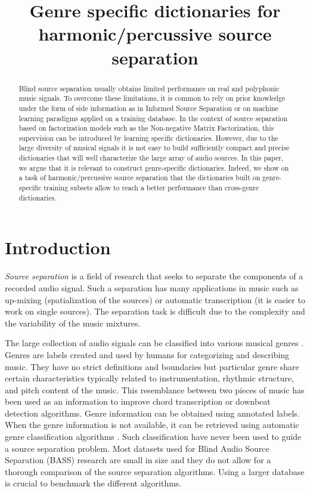 \documentclass{article}
\title{Genre specific dictionaries for harmonic/percussive source separation}
\begin{document}
%
\maketitle
%


\begin{abstract}

Blind source separation usually obtains limited performance on real and polyphonic music signals. To overcome these limitations, it is common to rely on prior knowledge under the form of side information as in Informed Source Separation or on machine learning paradigms applied on a training database. In the context of source separation based on factorization models such as the Non-negative Matrix Factorization, this supervision can be introduced by learning specific dictionaries. However, due to the large diversity of musical signals it is not easy to build sufficiently compact and precise dictionaries that will well characterize the large array of audio sources. In this paper, we argue that it is relevant to construct genre-specific dictionaries. Indeed, we show on a task of harmonic/percussive source separation that the dictionaries built on genre-specific training subsets allow to reach a better performance than cross-genre dictionaries.



\end{abstract}
%
\section{Introduction}\label{sec:introduction}


\emph{Source separation} is a field of research that seeks to separate the components of a recorded audio signal. Such a separation has many applications in music such as up-mixing \cite{fitzgerald2011upmixing} (spatialization of the sources) or automatic transcription \cite{vincent2010adaptive} (it is easier to work on single sources). The separation task is difficult due to the complexity and the variability of the music mixtures. 


The large collection of audio signals can be classified into various musical genres \cite{tzanetakis2002musical}. Genres are labels created and used by humans for categorizing and describing music. They have no strict definitions and boundaries but particular genre share certain characteristics typically related to instrumentation, rhythmic structure, and pitch content of the music. This resemblance between two pieces of music has been used as an information to improve chord transcription \cite{ni2012using,lee2008acoustic} or downbeat detection \cite{hockman2012one} algorithms. Genre information can be obtained using annotated labels. When the genre information is not available, it can be retrieved using automatic genre classification algorithms \cite{tzanetakis2002musical,mckay2006musical}. Such classification have never been used to guide a source separation problem. Most datasets used for Blind Audio Source Separation (BASS) research are small in size and they do not allow for a thorough comparison of the source separation algorithms. Using a larger database is crucial to benchmark the different algorithms.
\end{document}
